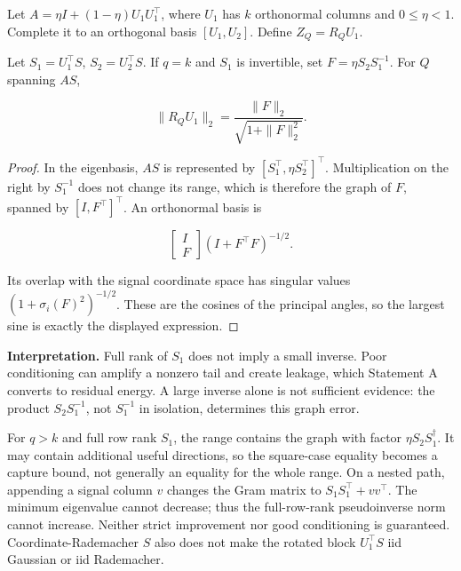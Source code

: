 \begin{lemma}\label{thm:T5b}
Let $A=\eta I+(1-\eta)U_1U_1^\top$, where $U_1$ has $k$ orthonormal columns and $0\le\eta<1$. Complete it to an orthogonal basis $[U_1,U_2]$. Define $Z_Q=R_QU_1$.


Let $S_1=U_1^\top S$, $S_2=U_2^\top S$. If $q=k$ and $S_1$ is invertible, set $F=\eta S_2S_1^{-1}$. For $Q$ spanning $AS$,


\begin{equation}
\boxed{\|R_QU_1\|_2=\frac{\|F\|_2}{\sqrt{1+\|F\|_2^2}}.}
\end{equation}


\end{lemma}
\begin{proof}
In the eigenbasis, $AS$ is represented by $[S_1^\top,\eta S_2^\top]^\top$. Multiplication on the right by $S_1^{-1}$ does not change its range, which is therefore the graph of $F$, spanned by $[I,F^\top]^\top$. An orthonormal basis is


\begin{equation}
\begin{bmatrix}I\\F\end{bmatrix}(I+F^\top F)^{-1/2}.
\end{equation}


Its overlap with the signal coordinate space has singular values $(1+\sigma_i(F)^2)^{-1/2}$. These are the cosines of the principal angles, so the largest sine is exactly the displayed expression.

\end{proof}


\textbf{Interpretation.} Full rank of $S_1$ does not imply a small inverse. Poor conditioning can amplify a nonzero tail and create leakage, which Statement A converts to residual energy. A large inverse alone is not sufficient evidence: the product $S_2S_1^{-1}$, not $S_1^{-1}$ in isolation, determines this graph error.


For $q>k$ and full row rank $S_1$, the range contains the graph with factor $\eta S_2S_1^\dagger$. It may contain additional useful directions, so the square-case equality becomes a capture bound, not generally an equality for the whole range. On a nested path, appending a signal column $v$ changes the Gram matrix to $S_1S_1^\top+vv^\top$. The minimum eigenvalue cannot decrease; thus the full-row-rank pseudoinverse norm cannot increase. Neither strict improvement nor good conditioning is guaranteed. Coordinate-Rademacher $S$ also does not make the rotated block $U_1^\top S$ iid Gaussian or iid Rademacher.

